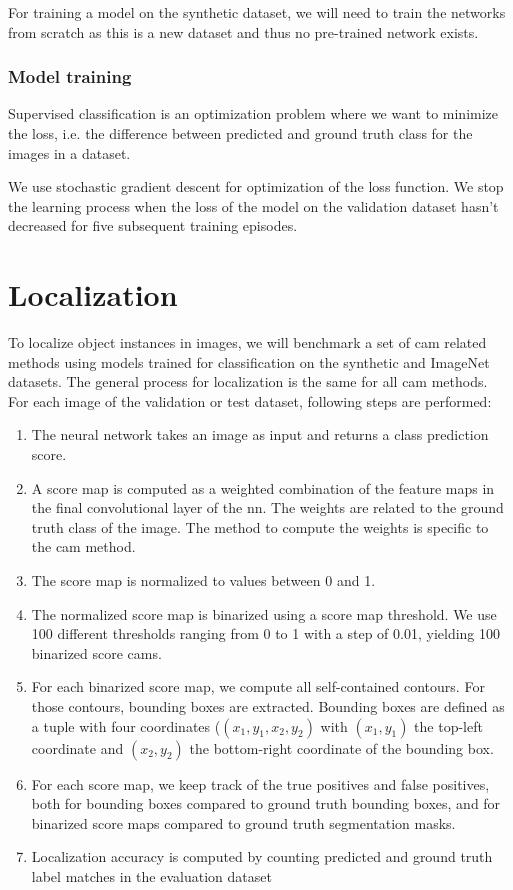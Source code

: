 For training a model on the synthetic dataset, we will need to train the networks from scratch as this is a new dataset and thus no pre-trained network exists.

\subsubsection{Model training}
Supervised classification is an optimization problem where we want to minimize the loss, i.e. the difference between predicted and ground truth class for the images in a dataset.

We use stochastic gradient descent for optimization of the loss function. We stop the learning process when the loss of the model on the validation dataset hasn't decreased for five subsequent training episodes.

\section{Localization} \label{lb:wsol_methods}
To localize object instances in images, we will benchmark a set of \acrshort{cam} related methods using models trained for classification on the synthetic and ImageNet datasets. The general process for localization is the same for all \acrshort{cam} methods. For each image of the validation or test dataset, following steps are performed:
\begin{enumerate}
    \item The neural network takes an image as input and returns a class prediction score.
    \item A score map is computed as a weighted combination of the feature maps in the final convolutional layer of the \acrshort{nn}. The weights are related to the ground truth class of the image. The method to compute the weights is specific to the \acrshort{cam} method.
    \item The score map is normalized to values between 0 and 1.
    \item The normalized score map is binarized using a score map threshold. We use 100 different thresholds ranging from 0 to 1 with a step of 0.01, yielding 100 binarized score cams.
    \item For each binarized score map, we compute all self-contained contours. For those contours, bounding boxes are extracted. Bounding boxes are defined as a tuple with four coordinates ($(x_1, y_1, x_2, y_2)$ with $(x_1, y_1)$ the top-left coordinate and $(x_2, y_2)$ the bottom-right coordinate of the bounding box.
    \item For each score map, we keep track of the true positives and false positives, both for bounding boxes compared to ground truth bounding boxes, and for binarized score maps compared to ground truth segmentation masks.
    \item Localization accuracy is computed by counting predicted and ground truth label matches in the evaluation dataset
\end{enumerate}
